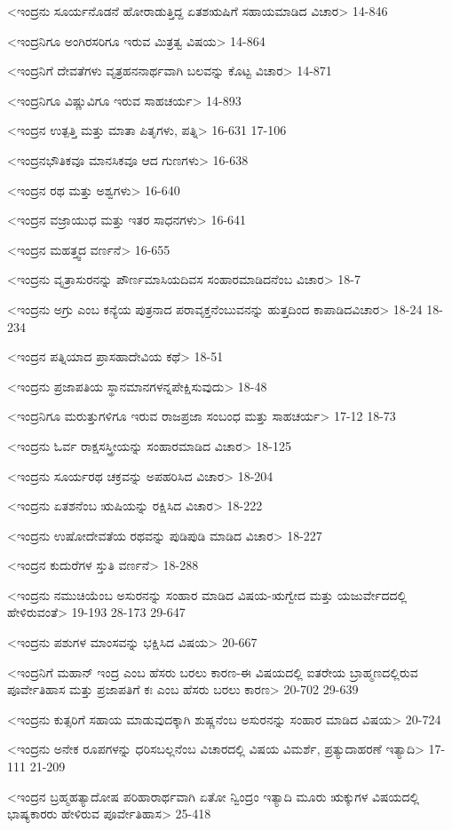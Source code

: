<ಇಂದ್ರನು ಸೂರ್ಯನೊಡನೆ ಹೋರಾಡುತ್ತಿದ್ದ ಏತಶಋಷಿಗೆ ಸಹಾಯಮಾಡಿದ ವಿಚಾರ>
14-846

<ಇಂದ್ರನಿಗೂ ಅಂಗಿರಸರಿಗೂ ಇರುವ ಮಿತ್ರತ್ವ ವಿಷಯ>
14-864

<ಇಂದ್ರನಿಗೆ ದೇವತೆಗಳು ವೃತ್ರಹನನಾರ್ಥವಾಗಿ ಬಲವನ್ನು ಕೊಟ್ಟ ವಿಚಾರ>
14-871

<ಇಂದ್ರನಿಗೂ ವಿಷ್ಣುವಿಗೂ ಇರುವ ಸಾಹಚರ್ಯ>
14-893

<ಇಂದ್ರನ ಉತ್ಪತ್ತಿ ಮತ್ತು ಮಾತಾ ಪಿತೃಗಳು, ಪತ್ನಿ>
16-631
17-106

<ಇಂದ್ರನಭೌತಿಕವೂ ಮಾನಸಿಕವೂ ಆದ ಗುಣಗಳು>
16-638

<ಇಂದ್ರನ ರಥ ಮತ್ತು ಅಶ್ವಗಳು>
16-640

<ಇಂದ್ರನ ವಜ್ರಾಯುಧ ಮತ್ತು ಇತರ ಸಾಧನಗಳು>
16-641

<ಇಂದ್ರನ ಮಹತ್ತ್ವದ ವರ್ಣನೆ>
16-655

<ಇಂದ್ರನು ವೃತ್ರಾಸುರನನ್ನು ಪೌರ್ಣಮಾಸಿಯದಿವಸ ಸಂಹಾರಮಾಡಿದನೆಂಬ ವಿಚಾರ>
18-7

<ಇಂದ್ರನು ಅಗ್ರು ಎಂಬ ಕನ್ಯೆಯ ಪುತ್ರನಾದ ಪರಾವೃಕ್ತನೆಂಬುವನನ್ನು ಹುತ್ತದಿಂದ ಕಾಪಾಡಿದವಿಚಾರ>
18-24
18-234

<ಇಂದ್ರನ ಪತ್ನಿಯಾದ ಪ್ರಾಸಹಾದೇವಿಯ ಕಥೆ>
18-51

<ಇಂದ್ರನು ಪ್ರಜಾಪತಿಯ ಸ್ಥಾನಮಾನಗಳನ್ನಪೇಕ್ಷಿಸುವುದು>
18-48

<ಇಂದ್ರನಿಗೂ ಮರುತ್ತುಗಳಿಗೂ ಇರುವ ರಾಜಪ್ರಜಾ ಸಂಬಂಧ ಮತ್ತು ಸಾಹಚರ್ಯ>
17-12
18-73

<ಇಂದ್ರನು ಓರ್ವ ರಾಕ್ಷಸಸ್ತ್ರೀಯನ್ನು ಸಂಹಾರಮಾಡಿದ ವಿಚಾರ>
18-125

<ಇಂದ್ರನು ಸೂರ್ಯರಥ ಚಕ್ರವನ್ನು ಅಪಹರಿಸಿದ ವಿಚಾರ>
18-204

<ಇಂದ್ರನು ಏತಶನೆಂಬ ಋಷಿಯನ್ನು ರಕ್ಷಿಸಿದ ವಿಚಾರ>
18-222

<ಇಂದ್ರನು ಉಷೋದೇವತೆಯ ರಥವನ್ನು ಪುಡಿಪುಡಿ ಮಾಡಿದ ವಿಚಾರ>
18-227

<ಇಂದ್ರನ ಕುದುರೆಗಳ ಸ್ತುತಿ ವರ್ಣನೆ>
18-288

<ಇಂದ್ರನು ನಮುಚಿಯೆಂಬ ಅಸುರನನ್ನು ಸಂಹಾರ ಮಾಡಿದ ವಿಷಯ-ಋಗ್ವೇದ ಮತ್ತು ಯಜುರ್ವೇದದಲ್ಲಿ ಹೇಳಿರುವಂತೆ>
19-193 
28-173
29-647

<ಇಂದ್ರನು ಪಶುಗಳ ಮಾಂಸವನ್ನು ಭಕ್ಷಿಸಿದ ವಿಷಯ>
20-667

<ಇಂದ್ರನಿಗೆ ಮಹಾನ್‍ ಇಂದ್ರ ಎಂಬ ಹೆಸರು ಬರಲು ಕಾರಣ-ಈ ವಿಷಯದಲ್ಲಿ ಐತರೇಯ ಬ್ರಾಹ್ಮಣದಲ್ಲಿರುವ ಪೂರ್ವೇತಿಹಾಸ ಮತ್ತು ಪ್ರಜಾಪತಿಗೆ ಕಃ ಎಂಬ ಹೆಸರು ಬರಲು ಕಾರಣ>
20-702
29-639

<ಇಂದ್ರನು ಕುತ್ಸರಿಗೆ ಸಹಾಯ ಮಾಡುವುದಕ್ಕಾಗಿ ಶುಷ್ಣನೆಂಬ ಅಸುರನನ್ನು ಸಂಹಾರ ಮಾಡಿದ ವಿಷಯ>
20-724

<ಇಂದ್ರನು ಅನೇಕ ರೂಪಗಳನ್ನು ಧರಿಸಬಲ್ಲನೆಂಬ ವಿಚಾರದಲ್ಲಿ ವಿಷಯ ವಿಮರ್ಶೆ, ಪ್ರತ್ಯುದಾಹರಣೆ ಇತ್ಯಾದಿ>
17-111
21-209

<ಇಂದ್ರನ ಬ್ರಹ್ಮಹತ್ಯಾದೋಷ ಪರಿಹಾರಾರ್ಥವಾಗಿ ಏತೋ ನ್ವಿಂದ್ರಂ ಇತ್ಯಾದಿ ಮೂರು ಋಕ್ಕುಗಳ ವಿಷಯದಲ್ಲಿ ಭಾಷ್ಯಕಾರರು ಹೇಳಿರುವ ಪೂರ್ವೇತಿಹಾಸ>
25-418

